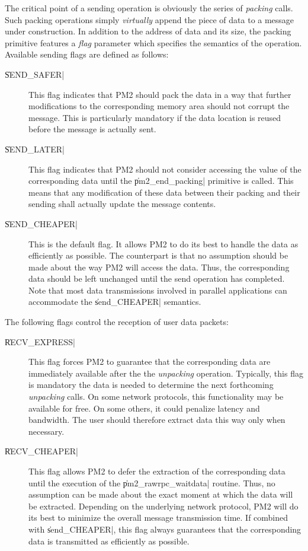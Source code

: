 The critical point of a sending operation is obviously the series of
\emph{packing} calls. Such packing operations simply \emph{virtually}
append the piece of data to a message under construction. In addition
to the address of data and its size, the packing primitive features a
\emph{flag} parameter which specifies the semantics of the operation.
Available sending flags are defined as follows:
\begin{description}
    
\item[\|SEND_SAFER|] This flag indicates that PM2 should pack the data
  in a way that further modifications to the corresponding memory area
  should not corrupt the message. This is particularly mandatory if
  the data location is reused before the message is actually sent.
  
\item[\|SEND_LATER|] This flag indicates that PM2 should not consider
  accessing the value of the corresponding data until the
  \|pm2_end_packing| primitive is called. This means that any
  modification of these data between their packing and their sending
  shall actually update the message contents.
    
\item[\|SEND_CHEAPER|] This is the default flag. It allows PM2 to do
  its best to handle the data as efficiently as possible. The
  counterpart is that no assumption should be made about the way PM2
  will access the data. Thus, the corresponding data should be left
  unchanged until the send operation has completed. Note that most
  data transmissions involved in parallel applications can accommodate
  the \|send_CHEAPER| semantics.

\end{description}
The following flags control the reception of user data packets:
\begin{description}
    
\item[\|RECV_EXPRESS|] This flag forces PM2 to guarantee that the
  corresponding data are immediately available after the the
  \emph{unpacking} operation. Typically, this flag is mandatory the
  data is needed to determine the next forthcoming \emph{unpacking}
  calls.  On some network protocols, this functionality may be
  available for free. On some others, it could penalize latency and
  bandwidth. The user should therefore extract data this way only when
  necessary.
    
\item[\|RECV_CHEAPER|] This flag allows PM2 to defer the extraction of
  the corresponding data until the execution of the
  \|pm2_rawrpc_waitdata| routine.  Thus, no assumption can be made
  about the exact moment at which the data will be extracted.
  Depending on the underlying network protocol, PM2 will do its best
  to minimize the overall message transmission time. If combined with
  \|send_CHEAPER|, this flag always guarantees that the corresponding
  data is transmitted as efficiently as possible.

\end{description}
